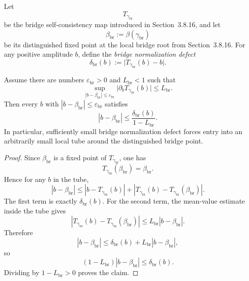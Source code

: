 \begin{definition}
\label{def:working-op1-bridge-defect}
Let
\[
  T_{\gamma_{\mathrm{br}}}
\]
be the bridge self-consistency map introduced in Section~3.8.16, and let
\[
  \beta_{\mathrm{br}}:=\beta(\gamma_{\mathrm{br}})
\]
be its distinguished fixed point at the local bridge root from Section~3.8.16. For any positive amplitude \(b\), define the \emph{bridge normalization defect}
\[
  \delta_{\mathrm{br}}(b):=
  \bigl|T_{\gamma_{\mathrm{br}}}(b)-b\bigr|.
\]
\end{definition}

\begin{proposition}
\label{prop:working-op1-residual-to-fixed-point}
Assume there are numbers \(\varepsilon_{\mathrm{br}}>0\) and \(L_{\mathrm{br}}<1\) such that
\[
  \sup_{|b-\beta_{\mathrm{br}}|\le \varepsilon_{\mathrm{br}}}
  \bigl|\partial_b T_{\gamma_{\mathrm{br}}}(b)\bigr|
  \le L_{\mathrm{br}}.
\]
Then every \(b\) with \(|b-\beta_{\mathrm{br}}|\le \varepsilon_{\mathrm{br}}\) satisfies
\[
  |b-\beta_{\mathrm{br}}|
  \le
  \frac{\delta_{\mathrm{br}}(b)}{1-L_{\mathrm{br}}}.
\]
In particular, sufficiently small bridge normalization defect forces entry into an arbitrarily small local tube around the distinguished bridge point.
\end{proposition}

\begin{proof}
Since \(\beta_{\mathrm{br}}\) is a fixed point of \(T_{\gamma_{\mathrm{br}}}\), one has
\[
  T_{\gamma_{\mathrm{br}}}(\beta_{\mathrm{br}})=\beta_{\mathrm{br}}.
\]
Hence for any \(b\) in the tube,
\[
  |b-\beta_{\mathrm{br}}|
  \le
  |b-T_{\gamma_{\mathrm{br}}}(b)|
  +
  |T_{\gamma_{\mathrm{br}}}(b)-T_{\gamma_{\mathrm{br}}}(\beta_{\mathrm{br}})|.
\]
The first term is exactly \(\delta_{\mathrm{br}}(b)\). For the second term, the mean-value estimate inside the tube gives
\[
  |T_{\gamma_{\mathrm{br}}}(b)-T_{\gamma_{\mathrm{br}}}(\beta_{\mathrm{br}})|
  \le
  L_{\mathrm{br}}|b-\beta_{\mathrm{br}}|.
\]
Therefore
\[
  |b-\beta_{\mathrm{br}}|
  \le
  \delta_{\mathrm{br}}(b)+L_{\mathrm{br}}|b-\beta_{\mathrm{br}}|,
\]
so
\[
  (1-L_{\mathrm{br}})|b-\beta_{\mathrm{br}}|
  \le
  \delta_{\mathrm{br}}(b).
\]
Dividing by \(1-L_{\mathrm{br}}>0\) proves the claim.
\end{proof}


